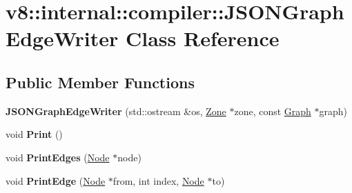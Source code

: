 \hypertarget{classv8_1_1internal_1_1compiler_1_1_j_s_o_n_graph_edge_writer}{}\section{v8\+:\+:internal\+:\+:compiler\+:\+:J\+S\+O\+N\+Graph\+Edge\+Writer Class Reference}
\label{classv8_1_1internal_1_1compiler_1_1_j_s_o_n_graph_edge_writer}
\subsection*{Public Member Functions}
\begin{DoxyCompactItemize}
\item 
{\bfseries J\+S\+O\+N\+Graph\+Edge\+Writer} (std\+::ostream \&os, \hyperlink{classv8_1_1internal_1_1_zone}{Zone} $\ast$zone, const \hyperlink{classv8_1_1internal_1_1compiler_1_1_graph}{Graph} $\ast$graph)\hypertarget{classv8_1_1internal_1_1compiler_1_1_j_s_o_n_graph_edge_writer_a9193915a7479dc4635125e0f504cab19}{}\label{classv8_1_1internal_1_1compiler_1_1_j_s_o_n_graph_edge_writer_a9193915a7479dc4635125e0f504cab19}

\item 
void {\bfseries Print} ()\hypertarget{classv8_1_1internal_1_1compiler_1_1_j_s_o_n_graph_edge_writer_aff9f180341a91e7ea140ae08df1ed689}{}\label{classv8_1_1internal_1_1compiler_1_1_j_s_o_n_graph_edge_writer_aff9f180341a91e7ea140ae08df1ed689}

\item 
void {\bfseries Print\+Edges} (\hyperlink{classv8_1_1internal_1_1compiler_1_1_node}{Node} $\ast$node)\hypertarget{classv8_1_1internal_1_1compiler_1_1_j_s_o_n_graph_edge_writer_a45ed893eccb7d258a853f82004e3f3cf}{}\label{classv8_1_1internal_1_1compiler_1_1_j_s_o_n_graph_edge_writer_a45ed893eccb7d258a853f82004e3f3cf}

\item 
void {\bfseries Print\+Edge} (\hyperlink{classv8_1_1internal_1_1compiler_1_1_node}{Node} $\ast$from, int index, \hyperlink{classv8_1_1internal_1_1compiler_1_1_node}{Node} $\ast$to)\hypertarget{classv8_1_1internal_1_1compiler_1_1_j_s_o_n_graph_edge_writer_a2d46147f53d1ebe6bda29f5c7aced3e6}{}\label{classv8_1_1internal_1_1compiler_1_1_j_s_o_n_graph_edge_writer_a2d46147f53d1ebe6bda29f5c7aced3e6}

\end{DoxyCompactItemize}
